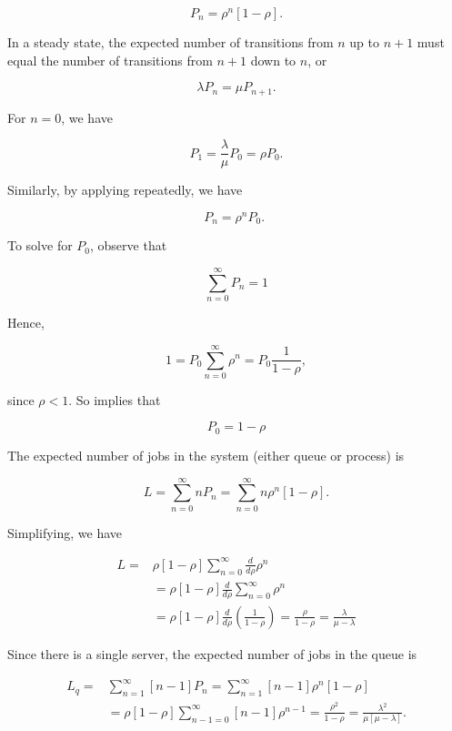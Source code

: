 \documentclass[main.tex]{subfiles}
\begin{document}
\begin{enumerate}
\begin{enumerate}
        $$
        P_n=\rho^n[1-\rho].
        $$ 
        
        In a steady state, the expected number of transitions from $n$ up to $n+1$ must equal the number of transitions from $n+1$ down to $n$, or 
        
        $$
        \lambda P_n=\mu P_{n+1}.
        $$
        
        For $n=0$, we have
        
        $$
        P_1=\frac{\lambda}{\mu} P_0=\rho P_0.
        $$
        
        Similarly, by applying repeatedly, we have
        
        $$
        P_n=\rho^n P_0 \text {. }
        $$
        
        To solve for $P_0$, observe that
        
        $$
        \sum_{n=0}^{\infty} P_n=1
        $$
        
        Hence,
        
        $$
        1=P_0 \sum_{n=0}^{\infty} \rho^n=P_0 \frac{1}{1-\rho},
        $$
        
        since $\rho<1$. So implies that
        
        $$
        P_0=1-\rho
        $$

        The expected number of jobs in the system (either queue or process) is 
        
        $$
        L=\sum_{n=0}^{\infty} n P_n=\sum_{n=0}^{\infty} n \rho^n[1-\rho].
        $$
        
        Simplifying, we have

        $$
        \begin{aligned}
        L= & \rho[1-\rho] \sum_{n=0}^{\infty} \frac{d}{d \rho} \rho^n \\
        & =\rho[1-\rho] \frac{d}{d \rho} \sum_{n=0}^{\infty} \rho^n \\
        & =\rho[1-\rho] \frac{d}{d \rho}\left(\frac{1}{1-\rho}\right)=\frac{\rho}{1-\rho}=\frac{\lambda}{\mu-\lambda}
        \end{aligned}
        $$
        
        Since there is a single server, the expected number of jobs in the queue is
        
        $$
        \begin{aligned}
        L_q= & \sum_{n=1}^{\infty}[n-1] P_n=\sum_{n=1}^{\infty}[n-1] \rho^n[1-\rho] \\
        & =\rho[1-\rho] \sum_{n-1=0}^{\infty}[n-1] \rho^{n-1}=\frac{\rho^2}{1-\rho}=\frac{\lambda^2}{\mu[\mu-\lambda]} .
        \end{aligned}
        $$
        

\end{enumerate}
\end{enumerate}
\end{document}
